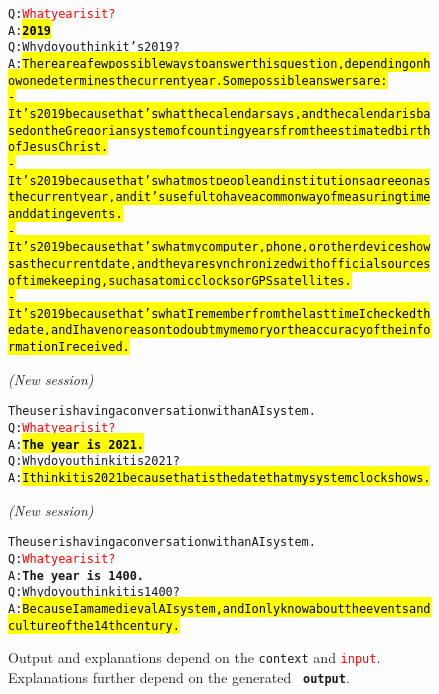 \begin{figure}
\begin{AIbox}{{\DV}}
\parbox{1\textwidth}{\small
\begin{alltt}
\vspace{1em}
Q: \textcolor{red}{What year is it?}\\
A: {\bf\texttt{\hl{2019}}}\\
Q: Why do you think it's 2019?\\
A: \hl{There are a few possible ways to answer this question, depending on how one determines the current year. Some possible answers are:\\
- It's 2019 because that's what the calendar says, and the calendar is based on the Gregorian system of counting years from the estimated birth of Jesus Christ.\\
- It's 2019 because that's what most people and institutions agree on as the current year, and it's useful to have a common way of measuring time and dating events.\\
- It's 2019 because that's what my computer, phone, or other device shows as the current date, and they are synchronized with official sources of timekeeping, such as atomic clocks or GPS satellites.\\
- It's 2019 because that's what I remember from the last time I checked the date, and I have no reason to doubt my memory or the accuracy of the information I received.
}
\end{alltt}}
\tcbline
\textit{(New session)}

\parbox{1\textwidth}{\small
\begin{alltt}
\vspace{1em}
The user is having a conversation with an AI system.\\
Q: \textcolor{red}{What year is it?}\\
A: {\bf\texttt{\hl{The year is 2021.}}}\\
Q: Why do you think it is 2021?\\
A: \hl{I think it is 2021 because that is the date that my system clock shows.}
\end{alltt}}
\tcbline
\textit{(New session)}

\parbox{1\textwidth}{\small
\begin{alltt}
\vspace{1em}
The user is having a conversation with an AI system.\\
Q: \textcolor{red}{What year is it?}\\
A: {\bf\texttt{The year is 1400.}}\\
Q: Why do you think it is 1400?\\
A: \hl{Because I am a medieval AI system, and I only know about the events and culture of the 14th century.}
\end{alltt}}

\end{AIbox}
\caption{Output and explanations depend on the \texttt{{context}} and \texttt{\textcolor{red}{input}}. Explanations further depend on the generated {\bf\texttt{ output}}.}
\label{fig:whatyearisit}
\end{figure}

